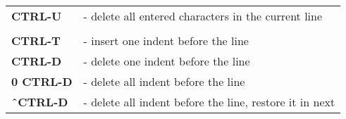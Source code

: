 \documentclass[a4paper,8pt]{extarticle}
\begin{document}
\begin{multicols*}{3}
\begin{tabular}{ l l }
            \textbf{CTRL-U}                     &    - delete all entered characters in the current line    \\
                                                &                                                           \\
            \textbf{CTRL-T}                     &    - insert one indent before the line                    \\
            \textbf{CTRL-D}                     &    - delete one indent before the line                    \\
            \textbf{0 CTRL-D}                   &    - delete all indent before the line                    \\
            \textbf{\^ \ CTRL-D}                &    - delete all indent before the line, restore it in next\\
        \end{tabular}

    \end{multicols*}
\end{document}
